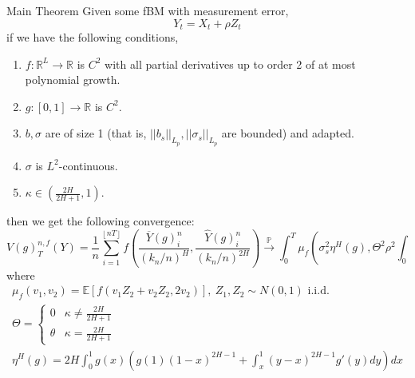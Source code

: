\documentclass[final,hyperref={pdfpagelabels=false}]{beamer}
\newcommand{\R}{\mathbb{R}}
\newcommand{\E}{\mathbb{E}}
\begin{document}
\begin{frame}{}
\begin{columns}[t]
      \begin{column}{0.4\linewidth}
        \begin{block}{Main Theorem}
          Given some fBM with measurement error,
          \begin{equation*}
            Y_t = X_t + \rho Z_t
          \end{equation*}
          if we have the following conditions,
          \begin{enumerate}
            \item \(f: \R^L \rightarrow \R\) is \(C^2\) with all partial derivatives up to order 2 of at most polynomial growth.
            \item \(g: [0,1] \rightarrow \R\) is \(C^2\).
            \item \(b, \sigma\) are of size 1 (that is, \(||b_s||_{L_p}, ||\sigma_s||_{L_p}\) are bounded) and adapted.
            \item \(\sigma\) is \(L^2\)-continuous.
            \item \(\kappa \in \left(\frac{2H}{2H+1}, 1\right)\).
          \end{enumerate}
          then we get the following convergence:
          \begin{equation*}
            V(g)^{n,f}_T(Y) = \frac{1}{n}\sum_{i=1}^{\left\lfloor nT \right\rfloor}f\left( \frac{\overline{Y}(g)^n_i}{\left( k_n/n \right)^H}, \frac{\widehat{Y}(g)^n_i}{\left( k_n/n \right)^{2H}} \right) \overset{\mathbb{P}}{\rightarrow} \int_0^T \mu_f\left( \sigma_s^2\eta^H\left( g \right), \Theta^2\rho^2 \int_0^1g'(r)^2dr \right)ds
          \end{equation*}
          where
          \begin{gather*}
            \mu_f(v_1, v_2) = \E\left[ f\left(v_1Z_2 + v_2Z_2, 2v_2\right) \right], \ Z_1, Z_2 \sim N(0, 1) \text{ i.i.d.} \\
            \Theta =
            \begin{cases}
              0 & \kappa \neq \frac{2H}{2H+1} \\
              \theta &  \kappa = \frac{2H}{2H+1}
            \end{cases} \\
            \eta^H(g) = 2H\int_0^1g(x)\left(g(1)(1-x)^{2H-1} + \int_x^1(y-x)^{2H-1}g'(y)dy\right)dx
          \end{gather*}
        \end{block}


\end{column}
\end{columns}
\end{frame}
\end{document}
